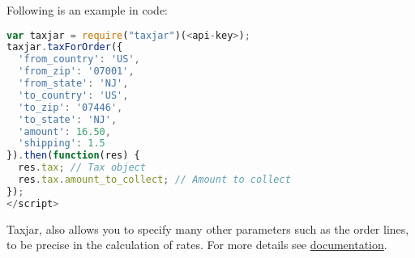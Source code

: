 Following is an example in code:
\begin{lstlisting}[language=javascript]
var taxjar = require("taxjar")(<api-key>);
taxjar.taxForOrder({
  'from_country': 'US',
  'from_zip': '07001',
  'from_state': 'NJ',
  'to_country': 'US',
  'to_zip': '07446',
  'to_state': 'NJ',
  'amount': 16.50,
  'shipping': 1.5
}).then(function(res) {
  res.tax; // Tax object
  res.tax.amount_to_collect; // Amount to collect
});
</script>
\end{lstlisting}
Taxjar, also allows you to specify many other parameters such as the order lines, to be precise in the calculation of rates. For more details see
\href{http://developers.taxjar.com/api/?javascript#introduction}{documentation}.